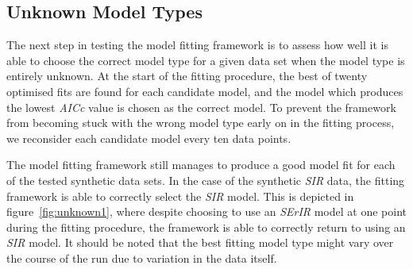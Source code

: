\subsection{Unknown Model Types}
The next step in testing the model fitting framework is to assess how
well it is able to choose the correct model type for a given data set
when the model type is entirely unknown. At the start of the fitting
procedure, the best of twenty optimised fits are found for each
candidate model, and the model which produces the lowest \emph{AICc}
value is chosen as the correct model. To prevent the framework from
becoming stuck with the wrong model type early on in the fitting
process, we reconsider each candidate model every ten data points.

The model fitting framework still manages to produce a good model fit
for each of the tested synthetic data sets. In the case of the synthetic
\emph{SIR} data, the fitting framework is able to correctly select the
\emph{SIR} model. This is depicted in figure~\ref{fig:unknown1}, where
despite choosing to use an \emph{SErIR} model at one point during the
fitting procedure, the framework is able to correctly return to using
an \emph{SIR} model. It should be noted that the best fitting model
type might vary over the course of the run due to variation in the
data itself.

